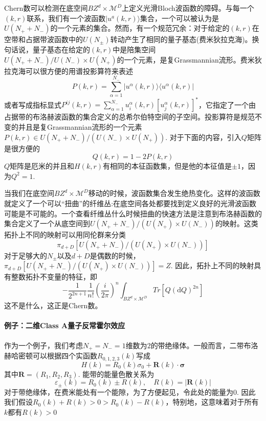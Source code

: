 \documentclass[a4paper]{article}
\numberwithin{equation}{subsection}
\begin{document}
Chern数可以检测在底空间$BZ^d\times\mathcal{M}^D$上定义光滑Bloch波函数的障碍。与每一个$(k,r)$联系，我们有一个波函数$|u^a(k,r)\rangle$集合，一个可以被认为是$U(N_++N_-)$的一个元素的集合。然而，有一个规范冗余：对于给定的$(k,r)$在空带和占据带波函数中的$U(N_{\pm})$转动产生了相同的量子基态(费米狄拉克海)。换句话说，量子基态在给定的$(k,r)$中是陪集空间$U(N_++N_-)/U(N_-)\times U(N_+)$的一个元素，是复Grassmannian流形。费米狄拉克海可以很方便的用谱投影算符来表述
\begin{equation}
    P(k,r)=\sum_{\alpha=1}^{N_-}|u^\alpha(k,r)\rangle\langle u^\alpha(k,r)|
\end{equation}
或者写成指标显式$P^{ij}(k,r)=\sum_{\alpha=1}^{N_-}u_i^\alpha(k,r)[u_j^\alpha(k,r)]^*$，它指定了一个由占据带的布洛赫波函数的集合定义的总希尔伯特空间的子空间。投影算符是规范不变的并且是复Grassmannian流形的一个元素$P(k,r)\in U(N_++N_-)/(U(N_-)\times U(N_+))$. 对于下面的内容，引入$Q$矩阵是很方便的
\begin{equation}
    Q(k,r)=1-2P(k,r)
\end{equation}
$Q$矩阵是厄米的并且和$H(k,r)$有相同的本征函数集，但是他的本征值是$\pm 1$，因为$Q^2=1$.

当我们在底空间$BZ^d\times \mathcal{M}^D$移动的时候，波函数集合发生绝热变化。这样的波函数就定义了一个可以“扭曲”的纤维丛:在底空间各处都要找到定义良好的光滑波函数可能是不可能的。一个查看纤维丛什么时候扭曲的快速方法是注意到布洛赫函数的集合定义了一个从底空间到$U(N_++N_-)/(U(N_+)\times U(N_-))$的映射。这类拓扑上不同的映射可以用同伦群来分类
\begin{equation}
    \pi_{d+D}[U(N_++N_-)/(U(N_+)\times U(N_-))]
\end{equation}
对于足够大的$N_\pm$以及$d+D$是偶数的时候，$\pi_{d+D}[U(N_++N_-)/(U(N_+)\times U(N_-))]=Z$. 因此，拓扑上不同的映射具有整数拓扑不变量的特征，即
\begin{equation}
    -\frac{1}{2^{2n+1}}\frac{1}{n!}\left(\frac{i}{2\pi}\right)^n\int_{BZ^d\times \mathcal{M}^D}Tr[Q(\mathrm{d}Q)^{2n}]
\end{equation}
这不是什么，这正是Chern数。
\paragraph{例子：二维Class A量子反常霍尔效应}
作为一个例子，我们考虑$N_+=N_-=1$维数为$2$的带绝缘体。一般而言，二带布洛赫哈密顿可以根据四个实函数$R_{0,1,2,3}(k)$写成
\begin{equation}
    H(k)=R_0(k)\sigma_0+\mathbf{R}(k)\cdot \mathbf{\sigma}
\end{equation}
其中$\mathbf{R}=(R_1,R_2,R_3)$. 能带的能量色散关系为
\begin{equation}
    \varepsilon_{\pm}(k)=R_0(k)\pm R(k),\quad R(k)=|\mathbf{R}(k)|
\end{equation}
对于带绝缘体，在费米能处有一个能隙，为了方便起见，令此处的能量为$0$. 因此我们假设$R_0(k)+R(k)>0>R_0(k)-R(k)$，特别地，这意味着对于所有$k$都有$R(k)>0$
\end{document}
